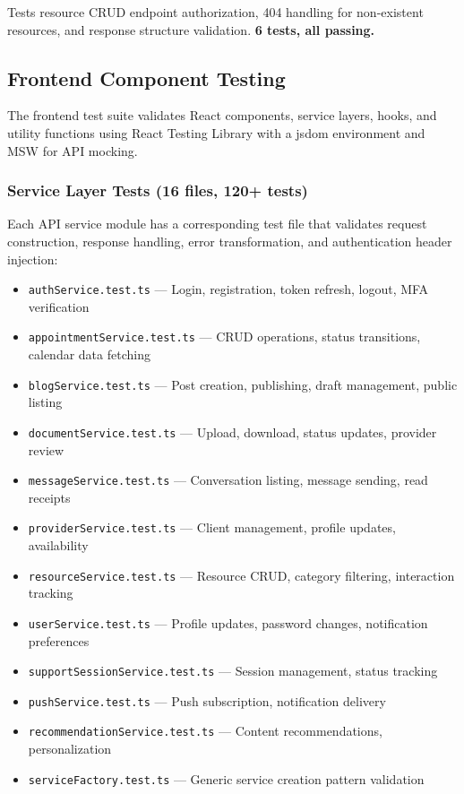\documentclass[12pt,letterpaper]{article}
\begin{document}
Tests resource CRUD endpoint authorization, 404 handling for non-existent resources, and response structure validation. \textbf{6 tests, all passing.}

\subsection{Frontend Component Testing}

The frontend test suite validates React components, service layers, hooks, and utility functions using React Testing Library with a jsdom environment and MSW for API mocking.

\subsubsection{Service Layer Tests (16 files, 120+ tests)}

Each API service module has a corresponding test file that validates request construction, response handling, error transformation, and authentication header injection:

\begin{itemize}[nosep]
  \item \texttt{authService.test.ts} --- Login, registration, token refresh, logout, MFA verification
  \item \texttt{appointmentService.test.ts} --- CRUD operations, status transitions, calendar data fetching
  \item \texttt{blogService.test.ts} --- Post creation, publishing, draft management, public listing
  \item \texttt{documentService.test.ts} --- Upload, download, status updates, provider review
  \item \texttt{messageService.test.ts} --- Conversation listing, message sending, read receipts
  \item \texttt{providerService.test.ts} --- Client management, profile updates, availability
  \item \texttt{resourceService.test.ts} --- Resource CRUD, category filtering, interaction tracking
  \item \texttt{userService.test.ts} --- Profile updates, password changes, notification preferences
  \item \texttt{supportSessionService.test.ts} --- Session management, status tracking
  \item \texttt{pushService.test.ts} --- Push subscription, notification delivery
  \item \texttt{recommendationService.test.ts} --- Content recommendations, personalization
  \item \texttt{serviceFactory.test.ts} --- Generic service creation pattern validation
\end{itemize}
\end{document}
